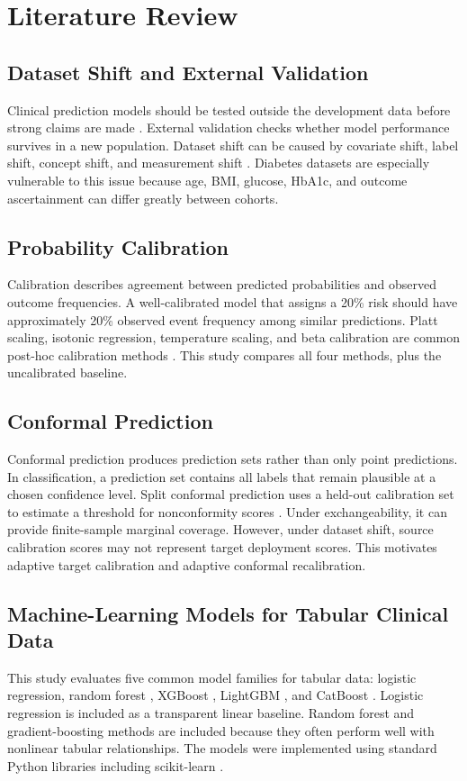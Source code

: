 \documentclass[11pt]{article}
\begin{document}
\section{Literature Review}
\subsection{Dataset Shift and External Validation}
Clinical prediction models should be tested outside the development data before strong claims are made \cite{tripod}. External validation checks whether model performance survives in a new population. Dataset shift can be caused by covariate shift, label shift, concept shift, and measurement shift \cite{datasetShift}. Diabetes datasets are especially vulnerable to this issue because age, BMI, glucose, HbA1c, and outcome ascertainment can differ greatly between cohorts.

\subsection{Probability Calibration}
Calibration describes agreement between predicted probabilities and observed outcome frequencies. A well-calibrated model that assigns a 20\% risk should have approximately 20\% observed event frequency among similar predictions. Platt scaling, isotonic regression, temperature scaling, and beta calibration are common post-hoc calibration methods \cite{plattScaling,zadrozny2002,guo2017,kull2017}. This study compares all four methods, plus the uncalibrated baseline.

\subsection{Conformal Prediction}
Conformal prediction produces prediction sets rather than only point predictions. In classification, a prediction set contains all labels that remain plausible at a chosen confidence level. Split conformal prediction uses a held-out calibration set to estimate a threshold for nonconformity scores \cite{vovk2005,shafer2008}. Under exchangeability, it can provide finite-sample marginal coverage. However, under dataset shift, source calibration scores may not represent target deployment scores. This motivates adaptive target calibration and adaptive conformal recalibration.

\subsection{Machine-Learning Models for Tabular Clinical Data}
This study evaluates five common model families for tabular data: logistic regression, random forest \cite{randomforest}, XGBoost \cite{xgboost}, LightGBM \cite{lightgbm}, and CatBoost \cite{catboost}. Logistic regression is included as a transparent linear baseline. Random forest and gradient-boosting methods are included because they often perform well with nonlinear tabular relationships. The models were implemented using standard Python libraries including scikit-learn \cite{sklearn}.
\end{document}

